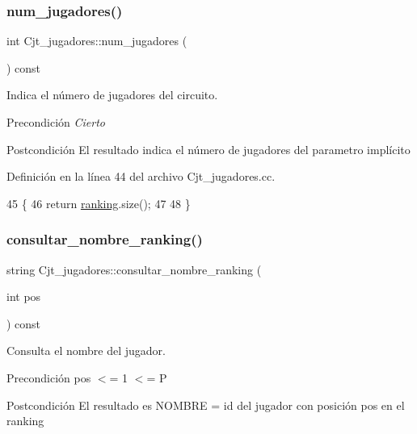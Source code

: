 \subsubsection{\texorpdfstring{num\+\_\+jugadores()}{num\_jugadores()}}
{\footnotesize\ttfamily int Cjt\+\_\+jugadores\+::num\+\_\+jugadores (\begin{DoxyParamCaption}{ }\end{DoxyParamCaption}) const}



Indica el número de jugadores del circuito. 

\begin{DoxyPrecond}{Precondición}
{\itshape Cierto} 
\end{DoxyPrecond}
\begin{DoxyPostcond}{Postcondición}
El resultado indica el número de jugadores del parametro implícito 
\end{DoxyPostcond}


Definición en la línea 44 del archivo Cjt\+\_\+jugadores.\+cc.


\begin{DoxyCode}
45 \{
46   \textcolor{keywordflow}{return} \hyperlink{class_cjt__jugadores_a2a64dd6a0c9315af038dfdb4c27da059}{ranking}.size();
47 
48 \}
\end{DoxyCode}
\mbox{\label{class_cjt__jugadores_ad8d836a5be49a639ffed71a643080d53}} 
\subsubsection{\texorpdfstring{consultar\+\_\+nombre\+\_\+ranking()}{consultar\_nombre\_ranking()}}
{\footnotesize\ttfamily string Cjt\+\_\+jugadores\+::consultar\+\_\+nombre\+\_\+ranking (\begin{DoxyParamCaption}\item[{int}]{pos }\end{DoxyParamCaption}) const}



Consulta el nombre del jugador. 

\begin{DoxyPrecond}{Precondición}
pos $<$= 1 $<$= P 
\end{DoxyPrecond}
\begin{DoxyPostcond}{Postcondición}
El resultado es N\+O\+M\+B\+RE = id del jugador con posición pos en el ranking 
\end{DoxyPostcond}


